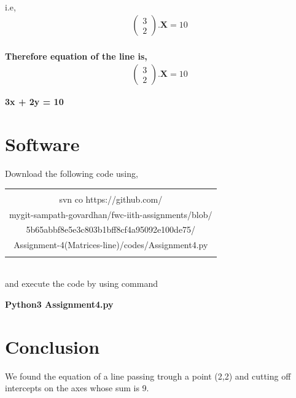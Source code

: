 \documentclass[journal,12pt,twocolumn]{IEEEtran}
\newcommand{\myvec}[1]{\ensuremath{\begin{pmatrix}#1\end{pmatrix}}}
\let\vec\mathbf
\begin{document}
  \\
i.e,    \\
\begin{align}
	\myvec{
  3\\
  2}
	.\vec{X} = 10
 \end{align}
\\
\textbf{
Therefore equation of the line is, \\
\begin{align}
	\myvec{
  3\\
  2}
	. \vec{X} = 10
 \end{align}}
\begin{center}
    \textbf{3x + 2y = 10}
\end{center}
\section{Software}
Download the following code using,
\begin{table}[h]
    \centering
    \begin{tabular}{|c|}
    \hline \\
         svn co https://github.com/\\mygit-sampath-govardhan/fwc-iith-assignments/blob/\\5b65abbf8e5e3c803b1bff8cf4a95092e100de75/\\Assignment-4(Matrices-line)/codes/Assignment4.py  \\
         \\
\hline
    \end{tabular}
\end{table}
\\
and execute the code by using command
\begin{center}
\textbf{Python3  Assignment4.py}\\
\end{center}

\section{Conclusion}
We found the equation of a line passing trough a point
(2,2) and cutting off intercepts on the axes whose
sum is 9.
\end{document}
